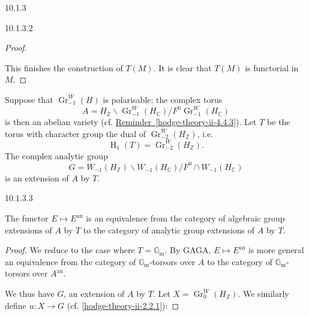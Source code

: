 \begin{construction}{10.1.3}
\begin{lemma}{10.1.3.2}
\begin{proof}
\begin{enumerate}
        \end{enumerate}\par{}This finishes the construction of \(T(M)\).
        It is clear that \(T(M)\) is functorial in \(M\).\end{proof}\end{lemma}\par{}Suppose that \(\operatorname {Gr}_{-1}^W(H)\) is polarisable;
    the complex torus
    \[       A       = H_\mathbb {Z} \backslash  \operatorname {Gr}_{-1}^W(H_\mathbb {C}) / F^0\operatorname {Gr}_{-1}^W(H_\mathbb {C})     \]
    is then an abelian variety (cf. \hyperref[hodge-theory-ii-4.4.3]{Reminder~\ref*{hodge-theory-ii-4.4.3}}).
    Let \(T\) be the torus with character group the dual of \(\operatorname {Gr}_{-2}^W(H_\mathbb {Z})\), i.e.
    \[       \operatorname {H}_1(T)       = \operatorname {Gr}_{-2}^W(H_\mathbb {Z}).     \]
    The complex analytic group
    \[       G       = W_{-1}(H_\mathbb {Z}) \backslash  W_{-1}(H_\mathbb {C}) / F^0\cap  W_{-1}(H_\mathbb {C})     \]
    is an extension of \(A\) by \(T\).\begin{lemma}{10.1.3.3}\label{hodge-theory-iii-10.1.3.3}\skipsinglepar\par{}The functor \(E\mapsto  E^\mathrm {an}\) is an equivalence from the category of algebraic group extensions of \(A\) by \(T\) to the category of analytic group extensions of \(A\) by \(T\).\begin{proof}\par{}We reduce to the case where \(T=\mathbb {G}_\mathrm {m}\).
        By GAGA, \(E\mapsto  E^\mathrm {an}\) is more general an equivalence from the category of \(\mathbb {G}_\mathrm {m}\)-torsors over \(A\) to the category of \(\mathbb {G}_\mathrm {m}\)-torsors over \(A^\mathrm {an}\).\par{}We thus have \(G\), an extension of \(A\) by \(T\).
        Let \(X=\operatorname {Gr}_0^W(H_\mathbb {Z})\).
        We similarly define \(u\colon  X\to  G\) (cf. \cref{hodge-theory-ii-2.2.1}):
        

\end{proof}
\end{lemma}
\end{construction}
